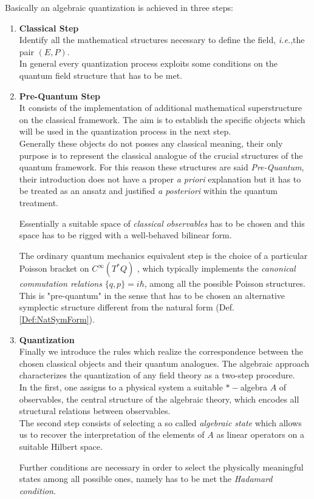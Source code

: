 \documentclass[Main]{subfiles}
\begin{document}
\vspace{3mm}
Basically an algebraic quantization is achieved in three steps:
\begin{enumerate}[label=\Alph*)]
	\item \textbf{Classical Step}\\
		Identify all the mathematical structures necessary to define the field, \textit{i.e.},the pair $(E,P)$.\\
		In general every quantization process exploits some conditions on the quantum field structure that has to be met.
	\item \textbf{Pre-Quantum Step}\\
		It consists of the implementation of additional %
		mathematical superstructure on the classical framework. The aim is to establish the specific objects which will be %
		used in the quantization process in the next step. \\
		Generally these objects do not posses any classical meaning, their only purpose is to represent the classical analogue of the crucial structures of the quantum framework.
		For this reason these structures are said \emph{Pre-Quantum}, their introduction does not have a proper \emph{a priori} explanation but it has to be treated as an ansatz and justified \emph{a posteriori} within the quantum treatment.

		Essentially a suitable space of \emph{classical observables} has to be chosen and this space has to be rigged with a well-behaved bilinear form.

		The ordinary quantum mechanics equivalent step is the choice of a particular Poisson bracket on $C^\infty(T^*Q)$ , which typically implements the \emph{canonical commutation relations} $\{q,p\}=i\hbar$, among all the possible Poisson structures.
		This is "pre-quantum" in the sense that has to be chosen an alternative symplectic structure different from the natural form (Def. \ref{Def:NatSymForm}).


	\item \textbf{Quantization}\\
		Finally we introduce the rules which realize the correspondence between the chosen classical objects and their quantum analogues.
		The algebraic approach characterizes the quantization of any field theory as a two-step procedure. \\
		In the first, one assigns to a physical system a suitable $\ast-$algebra $A$ of observables, the central structure of the algebraic theory, which encodes all structural relations between observables.\\
		The second step consists of selecting a so called \emph{algebraic state} which allows us to recover the interpretation of the elements of $A$ as linear operators on a suitable Hilbert space.

		Further conditions are necessary in order to select the physically meaningful states among all possible ones, namely has to be met the \emph{Hadamard condition}.


\end{enumerate}
\end{document}
